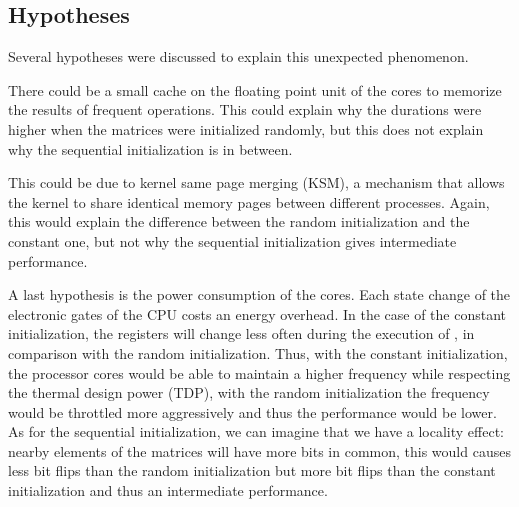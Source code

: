         \subsection{Hypotheses}
            Several hypotheses were discussed to explain this unexpected phenomenon.

            There could be a small cache  on the floating point unit of the cores to memorize the results of frequent
            operations. This could explain why the durations were higher when the matrices were initialized randomly,
            but this does not explain why the sequential initialization is in between.

            This could be due to kernel same page merging (KSM), a mechanism that allows the kernel to share identical
            memory pages between different processes. Again, this would explain the difference between the random
            initialization and the constant one, but not why the sequential initialization gives intermediate
            performance.

            A last hypothesis is the power consumption of the cores. Each state change of the electronic gates of the
            CPU costs an energy overhead. In the case of the constant initialization, the registers will change less
            often during the execution of \dgemm, in comparison with the random initialization. Thus, with the
            constant initialization, the processor cores would be able to maintain a higher frequency while respecting
            the thermal design power (TDP), with the random initialization the frequency would be throttled more
            aggressively and thus the performance would be lower.
            As for the sequential initialization, we can imagine that we have a locality effect: nearby elements of the
            matrices will have more bits in common, this would causes less bit flips than the random initialization but
            more bit flips than the constant initialization and thus an intermediate performance.

